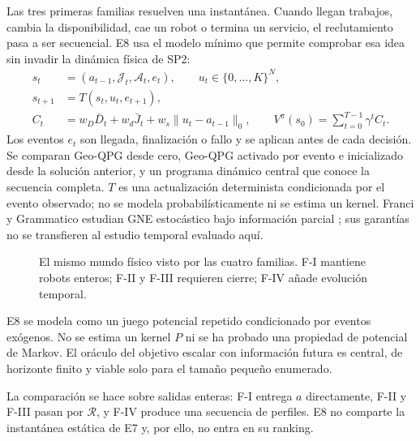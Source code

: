 Las tres primeras familias resuelven una instantánea. Cuando llegan trabajos,
cambia la disponibilidad, cae un robot o termina un servicio, el reclutamiento
pasa a ser secuencial. E8 usa el modelo mínimo que permite comprobar esa idea
sin invadir la dinámica física de SP2:
\begin{equation}
\label{eq:n4-markov-formulation}
\begin{aligned}
s_t&=(a_{t-1},\mathcal J_t,\mathcal A_t,e_t),
\qquad u_t\in\{0,\ldots,K\}^{N},\\
s_{t+1}&=T(s_t,u_t,e_{t+1}),\\
C_t&=w_D\bar D_t+w_d\bar J_t+w_s
\lVert u_t-a_{t-1}\rVert_0,
\qquad V^\pi(s_0)=\sum_{t=0}^{T-1}\gamma^tC_t .
\end{aligned}
\end{equation}
Los eventos $e_t$ son llegada, finalización o fallo y se aplican antes de cada
decisión. Se comparan Geo-QPG desde cero, Geo-QPG activado por evento e
inicializado desde la solución anterior, y un programa dinámico central que
conoce la secuencia completa. $T$ es una actualización determinista condicionada
por el evento observado; no se modela probabilísticamente ni se estima un kernel.
Franci y
Grammatico estudian GNE estocástico bajo información parcial
\parencite{franci2022stochasticGNE}; sus garantías no se transfieren al estudio
temporal evaluado aquí.

\begin{figure}[H]
\centering

\caption{El mismo mundo físico visto por las cuatro familias. F-I mantiene
robots enteros; F-II y F-III requieren cierre; F-IV añade evolución temporal.}
\label{fig:n4-same-world}
\viuownsource
\end{figure}

\begin{tcolorbox}[colback=SPFloor,colframe=VIUOrange!80,boxrule=.65pt,arc=1mm,
 left=2.2mm,right=2.2mm,top=1.6mm,bottom=1.6mm]
\small
E8 se modela como un juego potencial repetido condicionado por eventos exógenos.
No se estima un kernel $P$ ni se ha probado una propiedad de potencial de Markov.
El oráculo del objetivo escalar con información futura es central, de horizonte
finito y viable solo para el tamaño pequeño enumerado.
\end{tcolorbox}

La comparación se hace sobre salidas enteras: F-I entrega $a$ directamente,
F-II y F-III pasan por $\mathcal R$, y F-IV produce una secuencia de perfiles.
E8 no comparte la instantánea estática de E7 y, por ello, no entra en su ranking.

